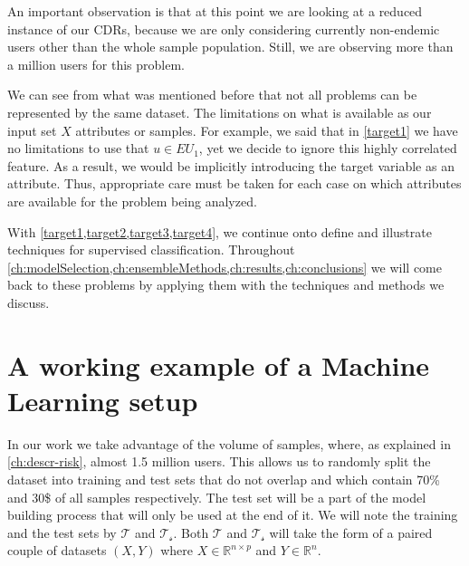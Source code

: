 An important observation is that at this point we are looking at a reduced instance of our CDRs, because we are only considering currently non-endemic users other than the whole sample population.
Still, we are observing more than a million users for this problem.






We can see from what was mentioned before that not all problems can be represented by the same dataset.
The limitations on what is available as our input set $X$ attributes or samples.
For example, we said that in \cref{target1} we have no limitations to use that $u \in EU_{1}$, yet we decide to ignore this highly correlated feature.
As a result, we  would be implicitly introducing the target variable as an attribute.
Thus, appropriate care must be taken for each case on which attributes are available for the problem being analyzed.


With \cref{target1,target2,target3,target4}, we continue onto define and illustrate techniques for supervised classification.
Throughout \cref{ch:modelSelection,ch:ensembleMethods,ch:results,ch:conclusions} we will come back to these problems by applying them with the techniques and methods we discuss.


\section{A working example of a Machine Learning setup}\label{section-example}

In our work we take advantage of the volume of samples, where, as explained in \cref{ch:descr-risk}, almost 1.5 million users.
This allows us to randomly split the dataset into training and test sets that do not overlap and which contain 70\% and 30\$ of all samples respectively.
The test set will be a part of the model building process that will only be used at the end of it.
We will note the training and the test sets by $\mathcal{T}$  and $\mathcal{T_s}$.
Both $\mathcal{T}$ and $\mathcal{T_s}$ will take the form of a paired couple of datasets $(X,Y)$ where $X \in \mathbb{R}^{n \times p}$ and $Y \in \mathbb{R}^n $.


